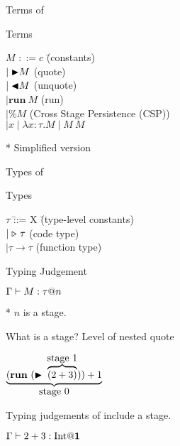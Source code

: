 \documentclass[dvipdfmx,aspectratio=169, 20pt]{beamer}
\renewcommand{\V}{\vdash}
\begin{document}
\begin{frame}[fragile]{Terms of \LTP}
    \begin{block}{Terms}
        \begin{tabbing}
            \hspace{5mm} \( M \) \= \( ::= c \) \hspace{20mm} \= (constants) \\
            \> \( \mid {\mathop{\blacktriangleright}} M \) \> (quote) \\
            \> \( \mid {\mathop{\blacktriangleleft}} M \) \> (unquote) \\
            \> \( \mid \textbf{run}\ M \) \> (run) \\
            \> \( \mid \% M \) \> (Cross Stage Persistence (CSP)) \\
            \> \( \mid x \mid \lambda x:\tau.M \mid M\ M \)
        \end{tabbing}
    \end{block}
    * Simplified version
\end{frame}

\begin{frame}[fragile]{Types of \LTP}
    \begin{block}{Types}
        \begin{tabbing}
            \hspace{5mm} \( \tau \) \= ::= X \hspace{20mm} \= (type-level constants) \\
            \> \( \mid {\mathop{\triangleright}}\ \tau \) \> (code type) \\
        \> \( \mid \tau \to \tau \) \> (function type)
    \end{tabbing}
    \end{block}
    
    \begin{block}{Typing Judgement}
        \begin{center}
            \( \G \V M : \tau @ n \)
        \end{center}
        * \( n \) is a stage.
    \end{block}
    
    \note{
    }
    \end{frame}

    \begin{frame}[fragile]{What is a stage?}
        Level of nested quote
        \begin{exampleblock}{}
            \begin{center}
                \( \underbrace{(\textbf{run}\ (\TB\ \overbrace{(2 + 3)}^{\let\scriptstyle\textstyle\substack{\text{stage }1}})) + 1}_{\let\scriptstyle\textstyle\substack{\text{stage }0}} \)
            \end{center}
        \end{exampleblock}

    Typing judgements of \LTP include a stage.
    \begin{center}
        \( \Gamma \vdash 2 + 3 : \textrm{Int} {\mathbf{@ 1}} \)
    \end{center}
    \note{
    }
\end{frame}
\end{document}
